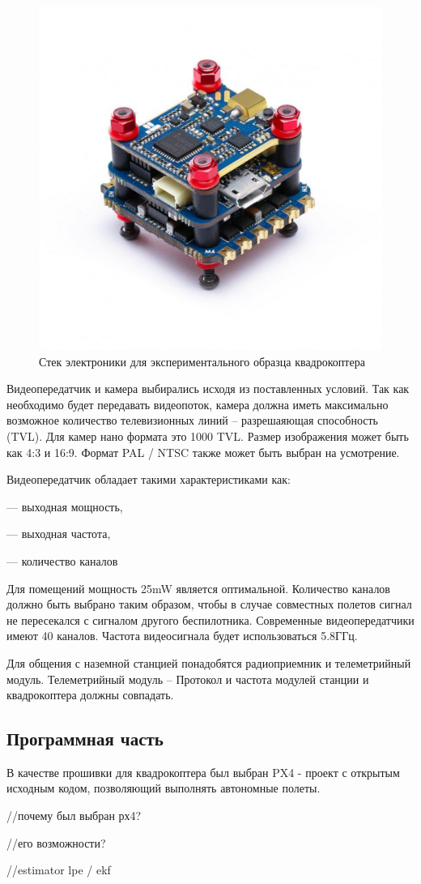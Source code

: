\begin{figure}[H]
	\centering
	\includegraphics[width=0.5\linewidth]{pics/stack}
	\caption{Стек электроники для экспериментального образца квадрокоптера
	}
	\label{fig:stack} %
\end{figure}
Видеопередатчик и камера выбирались исходя из поставленных условий. Так как необходимо будет передавать видеопоток, камера должна иметь максимально возможное количество телевизионных линий -- разрешаяющая способность (TVL). Для камер нано формата это 1000 TVL. Размер изображения может быть как 4:3 и 16:9. Формат PAL / NTSC также может быть выбран на усмотрение.

Видеопередатчик обладает такими характеристиками как:

--- выходная мощность,

--- выходная частота,

--- количество каналов

Для помещений мощность 25mW является оптимальной. Количество каналов должно быть выбрано таким образом, чтобы в случае совместных полетов сигнал не пересекался с сигналом другого беспилотника. Современные видеопередатчики имеют 40 каналов. Частота видеосигнала будет использоваться 5.8ГГц.

Для общения с наземной станцией понадобятся радиоприемник и телеметрийный модуль. Телеметрийный модуль -- 
Протокол и частота модулей станции и квадрокоптера должны совпадать.%

\subsection{Программная часть}
В качестве прошивки для квадрокоптера был выбран PX4 - проект с открытым исходным кодом, позволяющий выполнять автономные полеты.

//почему был выбран рх4?

//его возможности?

//estimator lpe / ekf

